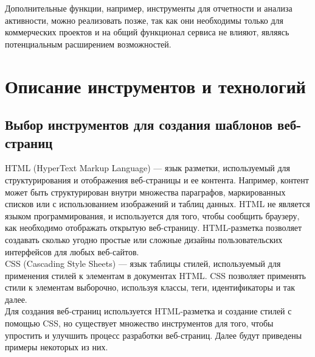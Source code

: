 \documentclass[a4paper,12pt]{article}
\begin{document}
Дополнительные функции, например, инструменты для отчетности и анализа активности, можно реализовать позже, так как они необходимы только для коммерческих проектов и на общий функционал сервиса не влияют, являясь потенциальным расширением возможностей.






\newpage
\section{Описание инструментов и технологий}
\subsection{Выбор инструментов для создания шаблонов веб-страниц}
HTML (HyperText Markup Language) — язык разметки, используемый для структурирования и отображения веб-страницы и ее контента. Например, контент может быть структурирован внутри множества параграфов, маркированных списков или с использованием изображений и таблиц данных. HTML не является языком программирования, и используется для того, чтобы сообщить браузеру, как необходимо отображать открытую веб-страницу. HTML-разметка позволяет создавать сколько угодно простые или сложные дизайны пользовательских интерфейсов для любых веб-сайтов. \cite{website:html}\\

CSS (Cascading Style Sheets) — язык таблицы стилей, используемый для применения стилей к элементам в документах HTML. CSS позволяет применять стили к элементам выборочно, используя классы, теги, идентификаторы и так далее. \cite{website:css}\\

Для создания веб-страниц используется HTML-разметка и создание стилей с помощью CSS, но существует множество инструментов для того, чтобы упростить и улучшить процесс разработки веб-страниц. Далее будут приведены примеры некоторых из них. \cite{website:hexlet}
\end{document}
